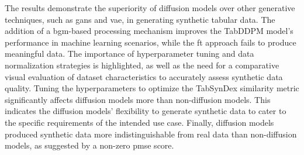 The results demonstrate the superiority of diffusion models over other generative techniques, such as \Glspl{gan} and \gls{vae}, in generating synthetic tabular data.
The addition of a \gls{bgm}-based processing mechanism improves the TabDDPM model's performance in machine learning scenarios, while the \gls{ft} approach fails to produce meaningful data. 
The importance of hyperparameter tuning and data normalization strategies is highlighted, as well as the need for a comparative visual evaluation of dataset characteristics to accurately assess synthetic data quality. 
Tuning the hyperparameters to optimize the TabSynDex similarity metric significantly affects diffusion models more than non-diffusion models. 
This indicates the diffusion models' flexibility to generate synthetic data to cater to the specific requirements of the intended use case.
Finally, diffusion models produced synthetic data more indistinguishable from real data than non-diffusion models, as suggested by a non-zero \gls{pmse} score.

\cleardoublepage 
